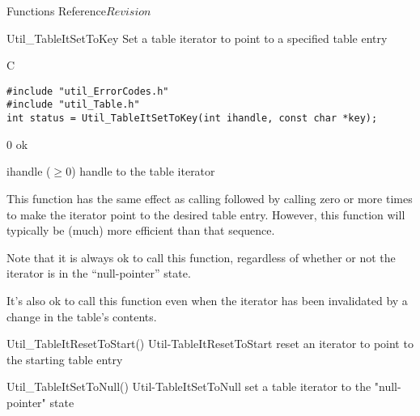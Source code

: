 \begin{cactuspart}{ Functions Reference}{}{$Revision$}
\begin{FunctionDescription}{Util\_TableItSetToKey}
\label{Util-TableItSetToKey}
Set a table iterator to point to a specified table entry

\begin{SynopsisSection}
\begin{Synopsis}{C}
\begin{verbatim}
#include "util_ErrorCodes.h"
#include "util_Table.h"
int status = Util_TableItSetToKey(int ihandle, const char *key);
\end{verbatim}
\end{Synopsis}
\end{SynopsisSection}

\begin{ResultSection}
\begin{Result}{\rm 0}
ok
\end{Result}
\end{ResultSection}

\begin{ParameterSection}
\begin{Parameter}{ihandle ($\ge 0$)}
handle to the table iterator
\end{Parameter}
\end{ParameterSection}

\begin{Discussion}
This function has the same effect as calling 
followed by calling  zero or more times
to make the iterator point to the desired table entry.  However, this
function will typically be (much) more efficient than that sequence.

Note that it is always ok to call this function, regardless of
whether or not the iterator is in the ``null-pointer'' state.

It's also ok to call this function even when the iterator has been
invalidated by a change in the table's contents.
\end{Discussion}

\begin{SeeAlsoSection}
\begin{SeeAlso2} {Util\_TableItResetToStart()} {Util-TableItResetToStart}
reset an iterator to point to the starting table entry
\end{SeeAlso2}
\begin{SeeAlso2} {Util\_TableItSetToNull()} {Util-TableItSetToNull}
set a table iterator to the "null-pointer" state
\end{SeeAlso2}
\end{SeeAlsoSection}


\end{FunctionDescription}
\end{cactuspart}
